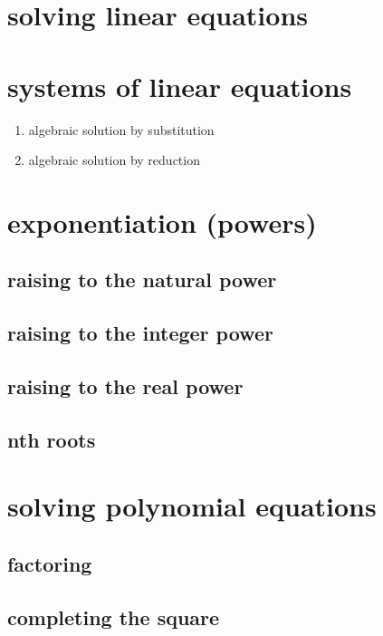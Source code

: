 \documentclass[12pt,paper=letter]{scrartcl}
\begin{document}
    \section{solving linear equations}


    \section{systems of linear equations}
    \begin{enumerate}
        \item algebraic solution by substitution
        \item algebraic solution by reduction
    \end{enumerate}


    \section{exponentiation (powers)}

    \subsection{raising to the natural power}

    \subsection{raising to the integer power}

    \subsection{raising to the real power}

    \subsection{nth roots}


    \section{solving polynomial equations}

    \subsection{factoring}

    \subsection{completing the square}
\end{document}

